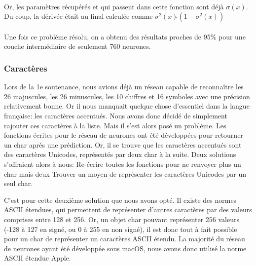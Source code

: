 \documentclass{article}
\begin{document}
\paragraph{}Or, les paramètres récupérés et qui passent dans cette fonction sont déjà $\sigma(x)$. Du coup, la dérivée était au final calculée comme $\sigma^2(x)\dot{}(1 - \sigma^2(x))$

\paragraph{}Une fois ce problème résolu, on a obtenu des résultats proches de 95\% pour une couche intermédiaire de seulement 760 neurones.

\subsubsection{Caractères}

Lors de la 1e soutenance, nous avions déjà un réseau capable de reconnaître les 26 majuscules, les 26 minuscules, les 10 chiffres et 16 symboles avec une précision relativement bonne. Or il nous manquait quelque chose d'essentiel dans la langue française: les caractères accentués.
Nous avons donc décidé de simplement rajouter ces caractères à la liste. Mais il s’est alors posé un problème. Les fonctions écrites pour le réseau de neurones ont été développées pour retourner un char après une prédiction. Or, il se trouve que les caractères accentués sont des caractères Unicodes, représentés par deux char à la suite.
Deux solutions s’offraient alors à nous:
Re-écrire toutes les fonctions pour ne renvoyer plus un char mais deux
Trouver un moyen de représenter les caractères Unicodes par un seul char.

C’est pour cette deuxième solution que nous avons opté.
Il existe des normes ASCII étendues, qui permettent de représenter d’autres caractères par des valeurs comprises entre 128 et 256. Or, un objet char pouvant représenter 256 valeurs (-128 à 127 en signé, ou 0 à 255 en non signé), il est donc tout à fait possible pour un char de représenter un caractères ASCII étendu.
La majorité du réseau de neurones ayant été développée sous macOS, nous avons donc utilisé la norme ASCII étendue Apple.
\end{document}
